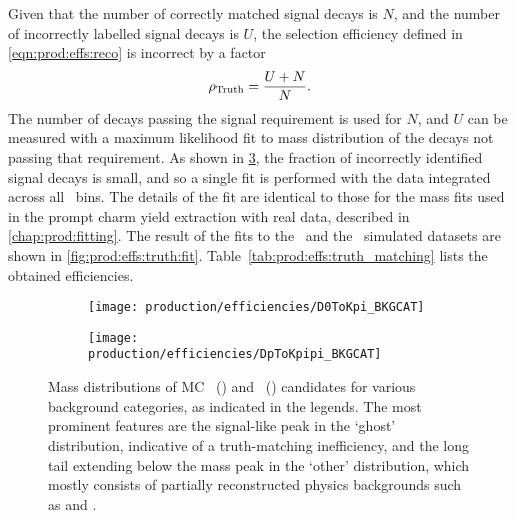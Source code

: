 Given that the number of correctly matched signal decays is $N$, and the number 
of incorrectly labelled signal decays is $U$, the selection efficiency defined 
in \cref{eqn:prod:effs:reco} is incorrect by a factor
\begin{equation}
  \rho_{\textnormal{Truth}} = \frac{U+N}{N}.
  \label{eqn:prod:effs:truth}
\end{equation}
The number of decays passing the signal requirement is used for $N$, and $U$ 
can be measured with a maximum likelihood fit to mass distribution of the 
decays not passing that requirement.
As shown in \cref{fig:prod:effs:truth:categories}, the fraction of incorrectly 
identified signal decays is small, and so a single fit is performed with the 
data integrated across all \pTy\ bins.
The details of the fit are identical to those for the mass fits used in the 
prompt charm yield extraction with real data, described in 
\cref{chap:prod:fitting}.
The result of the fits to the \DzToKpi\ and the \DpToKpipi\ simulated datasets 
are shown in \cref{fig:prod:effs:truth:fit}.
Table~\ref{tab:prod:effs:truth_matching} lists the obtained efficiencies.

\begin{figure}
  \begin{subfigure}[b]{0.5\textwidth}
    \centering
    \texttt{[image: production/efficiencies/D0ToKpi\_BKGCAT]}
    \caption{\DzToKpi}
    \label{fig:prod:effs:truth:categories:D0ToKpi}
  \end{subfigure}
  \begin{subfigure}[b]{0.5\textwidth}
    \centering
    \texttt{[image: production/efficiencies/DpToKpipi\_BKGCAT]}
    \caption{\DpToKpipi}
    \label{fig:prod:effs:truth:categories:DpToKpipi}
  \end{subfigure}
  \caption{%
    Mass distributions of \ac{MC} 
    \PDzero~() and 
    \PDplus~() candidates for 
    various background categories, as indicated in the legends.
    The most prominent features are the signal-like peak in the `ghost' 
    distribution, indicative of a truth-matching inefficiency, and the long 
    tail extending below the mass peak in the `other' distribution, which 
    mostly consists of partially reconstructed physics backgrounds such as 
    \decay{\PDzero}{\PKminus\Ppiplus\Ppizero} and 
    \decay{\PDplus}{\PKminus\Ppiplus\Ppiplus\Ppizero}.
  }
  \label{fig:prod:effs:truth:categories}
\end{figure}

